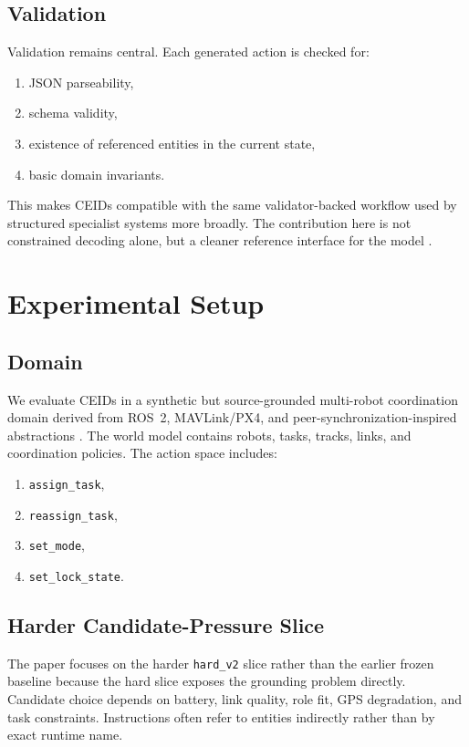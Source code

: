 \documentclass[11pt]{article}
\begin{document}
\subsection{Validation}
Validation remains central. Each generated action is checked for:
\begin{enumerate}[leftmargin=*,itemsep=0.25em]
  \item JSON parseability,
  \item schema validity,
  \item existence of referenced entities in the current state,
  \item basic domain invariants.
\end{enumerate}

This makes CEIDs compatible with the same validator-backed workflow used by structured specialist systems more broadly. The contribution here is not constrained decoding alone, but a cleaner reference interface for the model \citep{scholak2021picard,shin2021constrained,geng2023grammar,xia2025structured}.

\section{Experimental Setup}
\subsection{Domain}
We evaluate CEIDs in a synthetic but source-grounded multi-robot coordination domain derived from ROS~2, MAVLink/PX4, and peer-synchronization-inspired abstractions \citep{ros2_repo,px4_site,iroh_docs,p2panda_site}. The world model contains robots, tasks, tracks, links, and coordination policies. The action space includes:
\begin{enumerate}[leftmargin=*,itemsep=0.25em]
  \item \texttt{assign\_task},
  \item \texttt{reassign\_task},
  \item \texttt{set\_mode},
  \item \texttt{set\_lock\_state}.
\end{enumerate}

\subsection{Harder Candidate-Pressure Slice}
The paper focuses on the harder \texttt{hard\_v2} slice rather than the earlier frozen baseline because the hard slice exposes the grounding problem directly. Candidate choice depends on battery, link quality, role fit, GPS degradation, and task constraints. Instructions often refer to entities indirectly rather than by exact runtime name.
\end{document}
